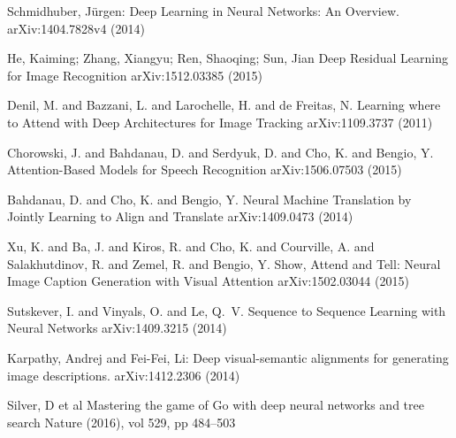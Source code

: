 \documentclass[citeauthoryear]{llncs}
\begin{document}
\begin{thebibliography}{}

Schmidhuber, J{\"u}rgen:
Deep Learning in Neural Networks: An Overview.
arXiv:1404.7828v4 (2014)


He, Kaiming; Zhang, Xiangyu; Ren, Shaoqing; Sun, Jian
Deep Residual Learning for Image Recognition
arXiv:1512.03385 (2015)


{Denil}, M. and {Bazzani}, L. and {Larochelle}, H. and {de Freitas}, N.
Learning where to Attend with Deep Architectures for Image Tracking
arXiv:1109.3737 (2011)

{Chorowski}, J. and {Bahdanau}, D. and {Serdyuk}, D. and {Cho}, K. and {Bengio}, Y.
Attention-Based Models for Speech Recognition
arXiv:1506.07503 (2015)


{Bahdanau}, D. and {Cho}, K. and {Bengio}, Y.
Neural Machine Translation by Jointly Learning to Align and Translate
arXiv:1409.0473 (2014)



{Xu}, K. and {Ba}, J. and {Kiros}, R. and {Cho}, K. and {Courville}, A. and {Salakhutdinov}, R. and {Zemel}, R. and {Bengio}, Y.
Show, Attend and Tell: Neural Image Caption Generation with Visual Attention
arXiv:1502.03044 (2015)


{Sutskever}, I. and {Vinyals}, O. and {Le}, Q.~V.
Sequence to Sequence Learning with Neural Networks
arXiv:1409.3215 (2014)

Karpathy, Andrej and Fei-Fei, Li:
Deep visual-semantic alignments for generating image descriptions.
arXiv:1412.2306 (2014)



Silver, D et al
Mastering the game of Go with deep neural networks and tree search
Nature (2016), vol 529, pp 484--503



\end{thebibliography}
\end{document}
